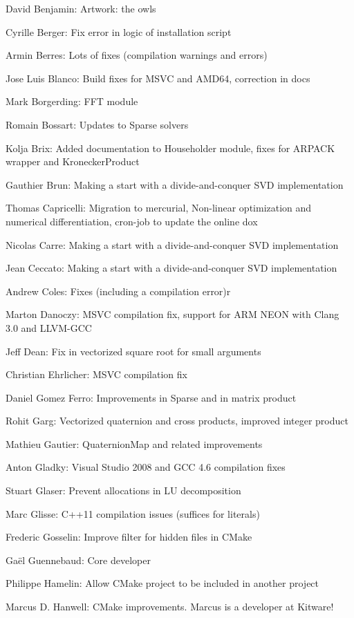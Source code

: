 David Benjamin:  Artwork: the owls  

Cyrille Berger:  Fix error in logic of installation script  

Armin Berres:  Lots of fixes (compilation warnings and errors)  

Jose Luis Blanco:  Build fixes for MSVC and AMD64, correction in docs  

Mark Borgerding:  FFT module  

Romain Bossart:  Updates to Sparse solvers  

Kolja Brix:  Added documentation to Householder module, fixes for ARPACK wrapper and KroneckerProduct  

Gauthier Brun:  Making a start with a divide-and-conquer SVD implementation  

Thomas Capricelli:  Migration to mercurial, Non-linear optimization and numerical differentiation, cron-job to update the online dox 

Nicolas Carre:  Making a start with a divide-and-conquer SVD implementation  

Jean Ceccato:  Making a start with a divide-and-conquer SVD implementation  

Andrew Coles:  Fixes (including a compilation error)r  

Marton Danoczy:  MSVC compilation fix, support for ARM NEON with Clang 3.0 and LLVM-GCC  

Jeff Dean:  Fix in vectorized square root for small arguments  

Christian Ehrlicher:  MSVC compilation fix  

Daniel Gomez Ferro:  Improvements in Sparse and in matrix product  

Rohit Garg:  Vectorized quaternion and cross products, improved integer product  

Mathieu Gautier:  QuaternionMap and related improvements  

Anton Gladky:  Visual Studio 2008 and GCC 4.6 compilation fixes  

Stuart Glaser:  Prevent allocations in LU decomposition  

Marc Glisse:  C++11 compilation issues (suffices for literals)  

Frederic Gosselin:  Improve filter for hidden files in CMake  

Gaël Guennebaud:  Core developer  

Philippe Hamelin:  Allow CMake project to be included in another project  

Marcus D. Hanwell:  CMake improvements. Marcus is a developer at Kitware!  

